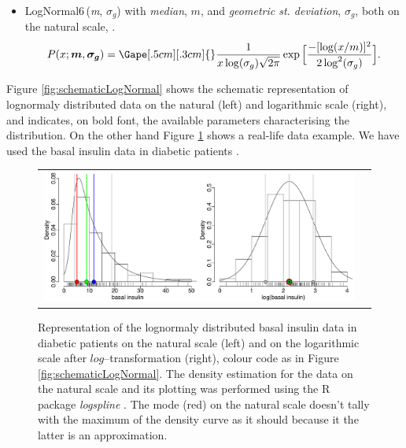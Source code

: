 {\begin{itemize}
\begin{align*}
P(x;\boldsymbol\mu,\boldsymbol \tau)=\Gape[.5cm][.3cm]{} \sqrt{\frac{\tau}{2 \pi}} \frac{1}{x} \exp\Big[ {-\frac{\tau}{2}(\log x-\mu)^2} \Big] 
\end{align*}
\item
LogNormal6\,(\textit{m}, $\sigma_g$)  with \emph{median}, $m$, and \emph{geometric st. deviation}, $\sigma_g$, both on the natural scale, \cite{limpert2001log}.
\begin{align*}
P(x;\boldsymbol m,\boldsymbol {\sigma_g})=\Gape[.5cm][.3cm]{} \frac{1}{x \log(\sigma_g)\sqrt{2 \pi}} \exp\Big[ \frac{-[\log(x/m)]^2}{2 \log^2(\sigma_g)}\Big].
\end{align*}
\end{itemize}

Figure \ref{fig:schematicLogNormal} shows the schematic representation of 
lognormaly distributed data on the natural (left) and logarithmic scale (right), 
and indicates, on bold font, the available parameters characterising the 
distribution. On the other hand Figure \ref{fig:insulinData} shows a real-life data 
example. We have used the basal insulin data in diabetic patients \cite{Rudenski:1991aa}.

\begin{figure}[htb!]
\centering
\begin{tabular}{cc}
 \includegraphics[width=160mm]{pics/Rudenski_LogNormalNormal}
\end{tabular}
\caption{Representation of the lognormaly distributed basal insulin data in diabetic patients 
\cite{Rudenski:1991aa} on the natural scale (left) and on the logarithmic scale after 
$log$--transformation (right), colour code as in Figure \ref{fig:schematicLogNormal}. 
The density estimation for the data on the natural scale and its plotting was performed 
using the R package \textit{logspline} \cite{Kooperberg:2013}. The mode (red) on the 
natural scale doesn't tally with the maximum of the density curve as it should because 
it the latter is an approximation.}
\label{fig:insulinData}
\end{figure}

}
